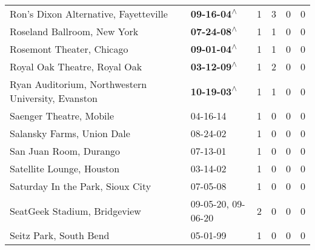 \begin{supertabular}{p{0.4\textwidth}p{0.3\textwidth}p{0.05\textwidth}p{0.05\textwidth}p{0.05\textwidth}p{0.05\textwidth}}
                                        Ron's Dixon Alternative, Fayetteville &                                                 \textbf{09-16-04\textsuperscript{$\wedge$}} &  1 &  3 &  0 &  0 \\
                                                  Roseland Ballroom, New York &                                                 \textbf{07-24-08\textsuperscript{$\wedge$}} &  1 &  1 &  0 &  0 \\
                                                    Rosemont Theater, Chicago &                                                 \textbf{09-01-04\textsuperscript{$\wedge$}} &  1 &  1 &  0 &  0 \\
                                                 Royal Oak Theatre, Royal Oak &                                                 \textbf{03-12-09\textsuperscript{$\wedge$}} &  1 &  2 &  0 &  0 \\
                           Ryan Auditorium, Northwestern University, Evanston &                                                 \textbf{10-19-03\textsuperscript{$\wedge$}} &  1 &  1 &  0 &  0 \\
                                                      Saenger Theatre, Mobile &                                                                  04-16-14\textsuperscript{} &  1 &  0 &  0 &  0 \\
                                                   Salansky Farms, Union Dale &                                                                  08-24-02\textsuperscript{} &  1 &  0 &  0 &  0 \\
                                                       San Juan Room, Durango &                                                                  07-13-01\textsuperscript{} &  1 &  0 &  0 &  0 \\
                                                    Satellite Lounge, Houston &                                                                  03-14-02\textsuperscript{} &  1 &  0 &  0 &  0 \\
                                             Saturday In the Park, Sioux City &                                                                  07-05-08\textsuperscript{} &  1 &  0 &  0 &  0 \\
                                                 SeatGeek Stadium, Bridgeview &                                      09-05-20\textsuperscript{}, 09-06-20\textsuperscript{} &  2 &  0 &  0 &  0 \\
                                                       Seitz Park, South Bend &                                                                  05-01-99\textsuperscript{} &  1 &  0 &  0 &  0 \\

\end{supertabular}
